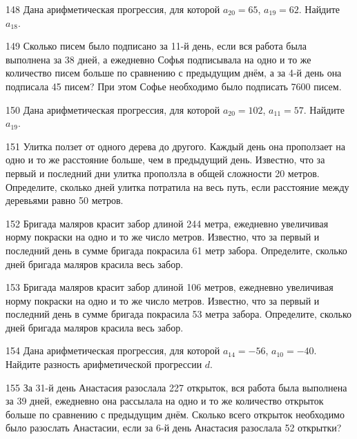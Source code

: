 \documentclass[4apaper]{article}
\begin{document}
\begin{taskBN}{148}
Дана арифметическая прогрессия, для которой $a_{20} = 65$, $a_{19} = 62$. Найдите $a_{18}$.
\end{taskBN}

\begin{taskBN}{149}
Сколько писем было подписано за 11-й день, если вся работа была выполнена за 38 дней, а ежедневно Софья подписывала на одно и то же количество писем больше по сравнению с предыдущим днём, а за 4-й день она подписала 45 писем? При этом Софье необходимо было подписать 7600 писем. 
\end{taskBN}

\begin{taskBN}{150}
Дана арифметическая прогрессия, для которой $a_{20} = 102$, $a_{11} = 57$. Найдите $a_{19}$.
\end{taskBN}

\begin{taskBN}{151}
 Улитка ползет от одного дерева до другого. Каждый день она проползает на одно и то же расстояние больше, чем в предыдущий день. Известно, что за первый и последний дни улитка проползла в общей сложности 20 метров. Определите, сколько дней улитка потратила на весь путь, если расстояние между деревьями равно 50 метров.
\end{taskBN}

\begin{taskBN}{152}
 Бригада маляров красит забор длиной 244 метра, ежедневно увеличивая норму покраски на одно и то же число метров. Известно, что за первый и последний день в сумме бригада покрасила 61 метр забора.  Определите, сколько дней бригада маляров красила весь забор. 
\end{taskBN}

\begin{taskBN}{153}
 Бригада маляров красит забор длиной 106 метров, ежедневно увеличивая норму покраски на одно и то же число метров. Известно, что за первый и последний день в сумме бригада покрасила 53 метра забора.  Определите, сколько дней бригада маляров красила весь забор. 
\end{taskBN}

\begin{taskBN}{154}
Дана арифметическая прогрессия, для которой $a_{14} = -56$, $a_{10} = -40$. Найдите разность арифметической прогрессии $d$.
\end{taskBN}

\begin{taskBN}{155}
За 31-й день Анастасия разослала 227 открыток, вся работа была выполнена за 39 дней, ежедневно она рассылала на одно и то же количество открыток больше по сравнению с предыдущим днём. Сколько всего открыток необходимо было разослать Анастасии, если за 6-й день Анастасия разослала 52 открытки? 
\end{taskBN}
\end{document}
